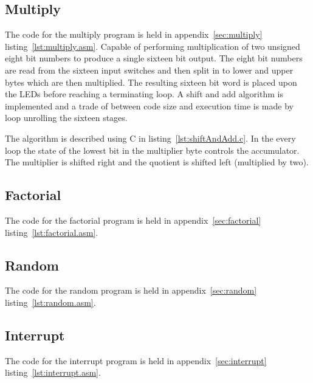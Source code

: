 \subsection{Multiply}
The code for the multiply program is held in appendix~\ref{sec:multiply} listing~\ref{lst:multiply.asm}.
Capable of performing multiplication of two unsigned eight bit numbers to produce a single sixteen bit output.
The eight bit numbers are read from the sixteen input switches and then split in to lower and upper bytes which are then multiplied.
The resulting sixteen bit word is placed upon the LEDs before reaching a terminating loop.
A shift and add algorithm is implemented and a trade of between code size and execution time is made by loop unrolling the sixteen stages.

The algorithm is described using C in listing~\ref{lst:shiftAndAdd.c}.
In the every loop the state of the lowest bit in the multiplier byte controls the accumulator.
The multiplier is shifted right and the quotient is shifted left (multiplied by two).



\subsection{Factorial}
The code for the factorial program is held in appendix~\ref{sec:factorial} listing~\ref{lst:factorial.asm}.

\subsection{Random}
The code for the random program is held in appendix~\ref{sec:random} listing~\ref{lst:random.asm}.

\subsection{Interrupt}
The code for the interrupt program is held in appendix~\ref{sec:interrupt} listing~\ref{lst:interrupt.asm}.

